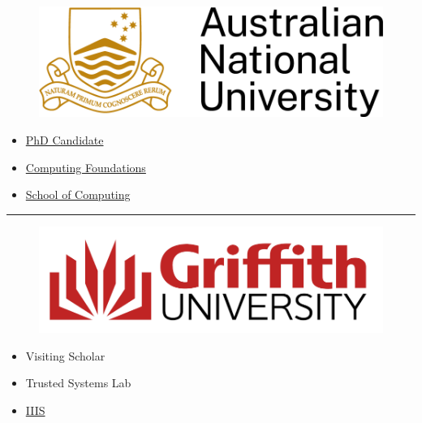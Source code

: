 
\begin{minipage}[t]{\linewidth}
\noindent
  \begin{minipage}{0.5\linewidth}
    \begin{figure}[h]
       \includegraphics[width=\linewidth]
         {Images/ANU.png}
    \end{figure}
  \end{minipage}
  \hfill
  \begin{minipage}{0.45\linewidth}
    \begin{itemize}
      \item 
        \href{https://comp.anu.edu.au/people/donovan-crichton/}
             {PhD Candidate}
      \item 
        \href{https://comp.anu.edu.au/research/clusters/computing-foundations/}
             {Computing Foundations}
      \item 
        \href{https://comp.anu.edu.au/}
             {School of Computing}
    \end{itemize}
  \end{minipage}
\end{minipage}
\hrule
  \begin{minipage}{0.5\linewidth}
    \begin{figure}[h]
      \includegraphics[scale=0.5,width=\linewidth]
        {Images/GriffithLogo.png}
    \end{figure}
  \end{minipage}
  \hfill
  \begin{minipage}{0.45\linewidth}
  \begin{itemize}
    \item Visiting Scholar
    \item Trusted Systems Lab
    \item \href{https://www.griffith.edu.au/institute-integrated-intelligent-systems}{IIIS}
  \end{itemize}
  \end{minipage}
